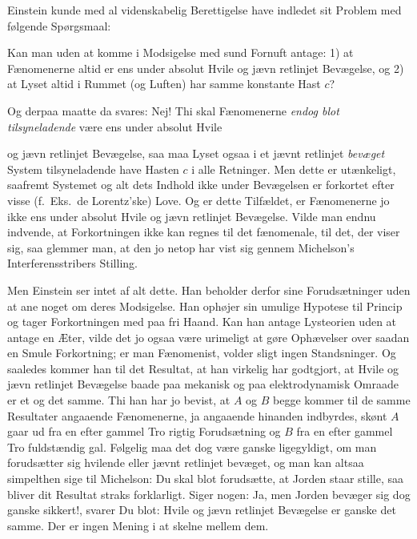 \documentclass[12pt,a4paper]{article}
\newcommand{\opage}[1]{\marginnote{\footnotesize\textit{[#1]}}}
\begin{document}
Einstein kunde med al videnskabelig Berettigelse have indledet sit Problem med
følgende Spørgsmaal:

Kan man uden at komme i Modsigelse med sund Fornuft antage: 1) at Fænomenerne
altid er ens under absolut Hvile og jævn retlinjet Bevægelse, og 2) at Lyset
altid i Rummet (og Luften) har samme konstante Hast $c$?

Og derpaa maatte da svares: Nej! Thi skal Fænomenerne \emph{endog blot
tilsyneladende} være ens under absolut Hvile

\opage{203} og jævn retlinjet Bevægelse, saa maa Lyset ogsaa i et jævnt retlinjet
\emph{bevæget} System tilsyneladende have Hasten $c$ i alle Retninger. Men
dette er utænkeligt, saafremt Systemet og alt dets Indhold ikke under
Bevægelsen er forkortet efter visse (f.\ Eks.\ de Lorentz'ske) Love. Og er
dette Tilfældet, er Fænomenerne jo ikke ens under absolut Hvile og jævn
retlinjet Bevægelse. Vilde man endnu indvende, at Forkortningen ikke kan regnes
til \guillemotleft det fænomenale\guillemotright, til det, der \guillemotleft
viser sig\guillemotright, saa glemmer man, at den jo netop har vist sig gennem
Michelson's Interferensstribers Stilling.

Men Einstein ser intet af alt dette. Han beholder derfor sine Forudsætninger
uden at ane noget om deres Modsigelse. Han ophøjer sin umulige Hypotese til
Princip og tager Forkortningen med paa fri Haand. Kan han antage Lysteorien
uden at antage en Æter, vilde det jo ogsaa være urimeligt at gøre Ophævelser
over saadan en Smule Forkortning; er man Fænomenist, volder sligt ingen
Standsninger. Og saaledes kommer han til det Resultat, at han virkelig har
godtgjort, at Hvile og jævn retlinjet Bevægelse baade paa mekanisk og paa
elektrodynamisk Omraade er et og det samme. Thi han har jo \guillemotleft
bevist\guillemotright, at $A$ og $B$ begge kommer til de samme Resultater
angaaende Fænomenerne, ja angaaende hinanden indbyrdes, skønt $A$ gaar ud fra
en efter gammel Tro rigtig Forudsætning og $B$ fra en efter gammel Tro
fuldstændig gal. Følgelig maa det dog være ganske ligegyldigt, om man
forudsætter sig hvilende eller jævnt retlinjet bevæget, og man kan altsaa
simpelthen sige til Michelson: Du skal blot forudsætte, at Jorden staar stille,
saa bliver dit Resultat straks forklarligt. Siger nogen: Ja, men Jorden bevæger
sig dog ganske sikkert!, svarer Du blot: Hvile og jævn retlinjet Bevægelse er
ganske det samme. Der er ingen Mening i at skelne mellem dem.
\end{document}
